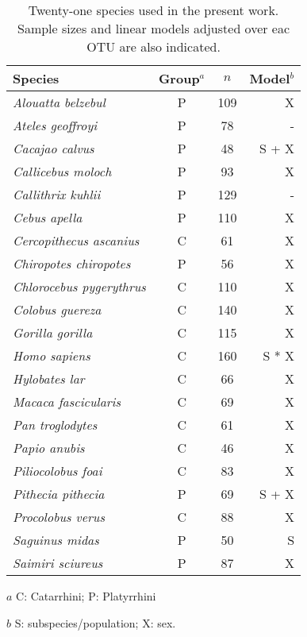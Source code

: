 \begin{table}[t]
  \centering
  \begin{threeparttable}
    \caption{Twenty-one species used in the present work. Sample sizes and linear models adjusted over eac OTU are also indicated. \label{tab:modcomp_otu}}
    \begin{tabular}{lccr}
        \toprule
        Species & Group$^a$ & $n$ & Model$^b$ \\ 
      \midrule
        \emph{Alouatta belzebul} & P & 109 & X \\ 
        \emph{Ateles geoffroyi} & P & 78 & - \\ 
        \emph{Cacajao calvus} & P & 48 & S + X \\ 
        \emph{Callicebus moloch} & P & 93 & X \\ 
        \emph{Callithrix kuhlii} & P & 129 & - \\ 
        \emph{Cebus apella} & P & 110 & X \\ 
        \emph{Cercopithecus ascanius} & C & 61 & X \\ 
        \emph{Chiropotes chiropotes} & P & 56 & X \\ 
        \emph{Chlorocebus pygerythrus} & C & 110 & X \\ 
        \emph{Colobus guereza} & C & 140 & X \\ 
        \emph{Gorilla gorilla} & C & 115 & X \\ 
        \emph{Homo sapiens} & C & 160 & S * X \\ 
        \emph{Hylobates lar} & C & 66 & X \\ 
        \emph{Macaca fascicularis} & C & 69 & X \\ 
        \emph{Pan troglodytes} & C & 61 & X \\ 
        \emph{Papio anubis} & C & 46 & X \\ 
        \emph{Piliocolobus foai} & C & 83 & X \\ 
        \emph{Pithecia pithecia} & P & 69 & S + X \\ 
        \emph{Procolobus verus} & C & 88 & X \\ 
        \emph{Saguinus midas} & P & 50 & S \\ 
        \emph{Saimiri sciureus} & P & 87 & X \\ 
      \bottomrule
    \end{tabular}
      \begin{tablenotes}
        \footnotesize
        {
        \item[$a$] C: Catarrhini; P: Platyrrhini
        \item[$b$] S: subspecies/population; X: sex.
        }
      \end{tablenotes}
    \end{threeparttable}
  \end{table}

